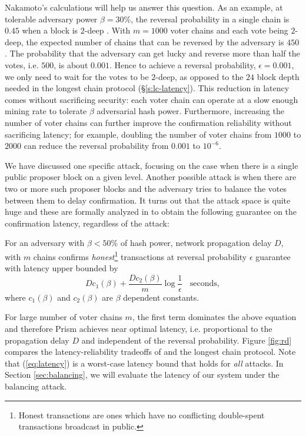 Nakamoto's calculations will help us answer this question. As an example, at tolerable adversary power $\beta = 30\%$, the reversal probability in a single chain is $0.45$ when a block is $2$-deep \cite{bitcoin}. With $m=1000$ voter chains and each vote being $2$-deep, the expected number of chains that can be reversed by the adversary is $450$. The probability that the adversary can get lucky and reverse more than half the votes, i.e. $500$, is about  $0.001$. Hence to achieve a reversal probability, $\epsilon = 0.001$, we only need to wait for the votes to be  $2$-deep, as opposed to the $24$ block depth needed in the longest chain protocol (\S\ref{s:lc-latency}). This reduction in latency comes without sacrificing security: each voter chain can operate at a slow enough mining rate to tolerate $\beta$ adversarial hash power. Furthermore, increasing the number of voter chains can further improve the confirmation reliability without sacrificing latency; for example, doubling the number of voter chains from $1000$ to $2000$ can reduce the reversal probability from $0.001$ to $10^{-6}$.

We have discussed one specific attack, focusing on the case when there is a single public proposer block on a given level. Another possible attack is when there are two or more such proposer blocks and the adversary tries to balance the votes between them to delay confirmation. It turns out that the attack space is quite huge and these are formally analyzed in \cite{prism-theory} to obtain the following guarantee on the confirmation latency, regardless of the attack:

 \begin{theorem} \label{cor:latency_fast}
For an adversary with $\beta< 50\%$ of hash power, network propagation delay $D$, \prism with $m$ chains confirms  \textit{honest}\footnote{Honest transactions are ones which have no conflicting double-spent transactions broadcast in public.} transactions at reversal probability $\epsilon$ guarantee with latency upper bounded by
\begin{equation}
\label{eq:latency}
 Dc_1(\beta) +  \frac{Dc_2(\beta)}{m} \log \frac{1}{\epsilon}\;\; \text{ seconds},
\end{equation}
where $c_1(\beta)$ and $c_2(\beta) $ are $\beta$ dependent constants.
\end{theorem}

For large number of voter chains $m$, the first term dominates the above equation and therefore Prism achieves near optimal latency, i.e. proportional to the propagation delay $D$ and independent of the reversal probability. Figure \ref{fig:rd} compares the latency-reliability tradeoffs of \prism and the longest chain protocol. Note that (\ref{eq:latency}) is a worst-case latency bound that holds for {\em all} attacks. In Section \ref{sec:balancing}, we will evaluate the latency of our system under the balancing attack. 



